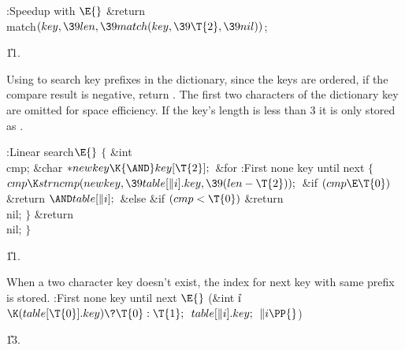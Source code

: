 \B{}:Speedup with \X${}\E{}$\6
\&{return} \\{match}${}(\\{key},\39\\{len},\39\\{match}(\\{key},\39\T{2},\39%
\\{nil})){}$;\par
\U11.\fi

Using  to search key prefixes in the dictionary, since
the
keys are ordered, if the compare result is negative, return . The
first two characters of the dictionary key are omitted for space
efficiency.  If the key's length is less than 3 it is only stored as
.

\Y\B\4:Linear search\X${}\E{}$\6
${}\{{}$\1\6
\&{int} \\{cmp};\6
\&{char} ${}{*}\\{newkey}\K{\AND}\\{key}[\T{2}];{}$\7
\&{for} :First none  key until next \X\5
${}\{{}$\1\6
${}\\{cmp}\K\\{strncmp}(\\{newkey},\39\\{table}[\|i].\\{key},\39(\\{len}-%
\T{2}));{}$\6
\&{if} ${}(\\{cmp}\E\T{0}){}$\1\5
\&{return} ${}{\AND}\\{table}[\|i];{}$\2\6
\&{else} \&{if} ${}(\\{cmp}<\T{0}){}$\1\5
\&{return} \\{nil};\2\6
\4${}\}{}$\2\6
\&{return} \\{nil};\6
\4${}\}{}$\2\par
\U11.\fi

When a two character key doesn't exist, the index for next key with
same prefix is stored.
\Y\B\4:First none  key until next \X${}\E{}$\6
(\&{int} \|i${}\K(\\{table}[\T{0}].\\{key})\?\T{0}:\T{1};{}$ ${}\\{table}[\|i].%
\\{key};{}$ ${}\|i\PP{}$)\par
\U13.\fi

